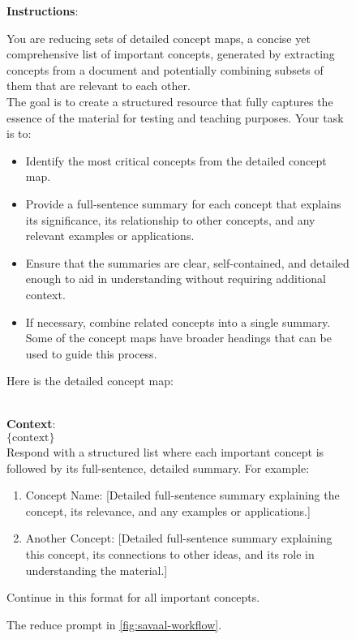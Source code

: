 \begin{figure}[h]
\centering
\begin{tcolorbox}[width=1\columnwidth, fontupper=\footnotesize,title=Reduce Prompt]
\RaggedRight
\obeylines
\textbf{Instructions}: \\
{You are reducing sets of detailed concept maps, a concise yet comprehensive list of important concepts, generated by extracting concepts from a document and potentially combining subsets of them that are relevant to each other. \\
The goal is to create a structured resource that fully captures the essence of the material for testing and teaching purposes.
\vspace{3mm}
Your task is to:
\begin{itemize}[label=-,nosep]
    \item Identify the most critical concepts from the detailed concept map.
    \item Provide a full-sentence summary for each concept that explains its significance, its relationship to other concepts, and any relevant examples or applications.
    \item Ensure that the summaries are clear, self-contained, and detailed enough to aid in understanding without requiring additional context.
    \item If necessary, combine related concepts into a single summary. Some of the concept maps have broader headings that can be used to guide this process.
\end{itemize}
\vspace{3mm}
\vspace{3mm}
Here is the detailed concept map:} \\
\vspace{3mm}
\vspace{3mm}
\textbf{Context}: \\
$\{\text{context}\}$ \\

Respond with a structured list where each important concept is followed by its full-sentence, detailed summary. For example:
\begin{enumerate}[nosep]
    \item Concept Name: [Detailed full-sentence summary explaining the concept, its relevance, and any examples or applications.]
    \item Another Concept: [Detailed full-sentence summary explaining this concept, its connections to other ideas, and its role in understanding the material.]
\end{enumerate}

Continue in this format for all important concepts.
\end{tcolorbox}
\caption{The reduce prompt in \autoref{fig:savaal-workflow}.}
\label{fig:reduce_prompt}
\end{figure}



